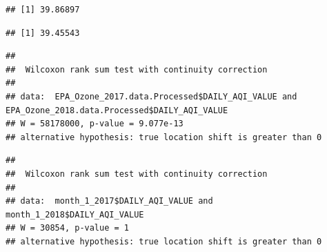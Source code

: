 \documentclass[12pt,]{article}
\newenvironment{Shaded}{\begin{snugshade}}{\end{snugshade}}
\newcommand{\KeywordTok}[1]{\textcolor[rgb]{0.13,0.29,0.53}{\textbf{#1}}}
\newcommand{\DataTypeTok}[1]{\textcolor[rgb]{0.13,0.29,0.53}{#1}}
\newcommand{\DecValTok}[1]{\textcolor[rgb]{0.00,0.00,0.81}{#1}}
\newcommand{\FloatTok}[1]{\textcolor[rgb]{0.00,0.00,0.81}{#1}}
\newcommand{\StringTok}[1]{\textcolor[rgb]{0.31,0.60,0.02}{#1}}
\newcommand{\OperatorTok}[1]{\textcolor[rgb]{0.81,0.36,0.00}{\textbf{#1}}}
\newcommand{\NormalTok}[1]{#1}
\begin{document}
\begin{verbatim}
## [1] 39.86897
\end{verbatim}

\begin{Shaded}
\end{Shaded}

\begin{verbatim}
## [1] 39.45543
\end{verbatim}

\begin{Shaded}
\end{Shaded}

\begin{verbatim}
## 
##  Wilcoxon rank sum test with continuity correction
## 
## data:  EPA_Ozone_2017.data.Processed$DAILY_AQI_VALUE and EPA_Ozone_2018.data.Processed$DAILY_AQI_VALUE
## W = 58178000, p-value = 9.077e-13
## alternative hypothesis: true location shift is greater than 0
\end{verbatim}

\begin{Shaded}
\end{Shaded}

\begin{verbatim}
## 
##  Wilcoxon rank sum test with continuity correction
## 
## data:  month_1_2017$DAILY_AQI_VALUE and month_1_2018$DAILY_AQI_VALUE
## W = 30854, p-value = 1
## alternative hypothesis: true location shift is greater than 0
\end{verbatim}
\end{document}
